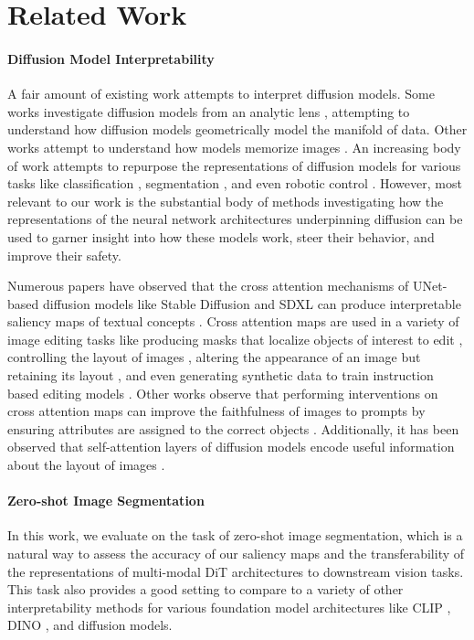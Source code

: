\section{Related Work}
\paragraph{Diffusion Model Interpretability}

A fair amount of existing work attempts to interpret diffusion models. Some works investigate diffusion models from an analytic lens \cite{kadkhodaie_generalization_2024, wang_diffusion_2024}, attempting to understand how diffusion models geometrically model the manifold of data. Other works attempt to understand how models memorize images \cite{carlini_extracting_2023}. An increasing body of work attempts to repurpose the representations of diffusion models for various tasks like classification \cite{li_your_2023}, segmentation \cite{karazija_diffusion_2024}, and even robotic control \cite{gupta_pre-trained_2024}. However, most relevant to our work is the substantial body of methods investigating how the representations of the neural network architectures underpinning diffusion can be used to garner insight into how these models work, steer their behavior, and improve their safety. 

Numerous papers have observed that the cross attention mechanisms of UNet-based diffusion models like Stable Diffusion \cite{rombach_high-resolution_2022} and SDXL \cite{podell_sdxl_2023} can produce interpretable saliency maps of textual concepts \cite{tang_what_2022}. Cross attention maps are used in a variety of image editing tasks like producing masks that localize objects of interest to edit \cite{dalva_fluxspace_2024}, controlling the layout of images \cite{chen_training-free_2023, epstein_diffusion_2023}, altering the appearance of an image but retaining its layout \cite{hertz_prompt--prompt_2022}, and even generating synthetic data to train instruction based editing models \cite{brooks_instructpix2pix_2023}. Other works observe that performing interventions on cross attention maps can improve the faithfulness of images to prompts by ensuring attributes are assigned to the correct objects \cite{meral_conform_2024, chefer_attend-and-excite_2023}.  Additionally, it has been observed that self-attention layers of diffusion models encode useful information about the layout of images \cite{liu_towards_2024}. 

%


\paragraph{Zero-shot Image Segmentation}
In this work, we evaluate \tool{} on the task of zero-shot image segmentation, which is a natural way to assess the accuracy of our saliency maps and the transferability of the representations of multi-modal DiT architectures to downstream vision tasks. This task also provides a good setting to compare to a variety of other interpretability methods for various foundation model architectures like CLIP \cite{radford_learning_2021}, DINO \cite{caron_emerging_2021}, and diffusion models.  

